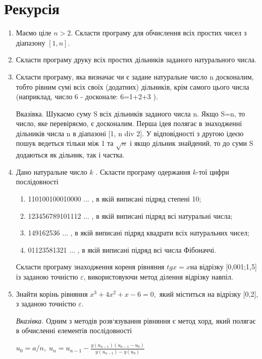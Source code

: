 \documentclass[]{article}
\makeatletter
\newcommand{\xslalph}[1]{\expandafter\@xslalph\csname c@#1\endcsname}
\newcommand{\@xslalph}[1]{%
    \ifcase#1\or а\or б\or в\or г\or д\or e\or є\or ж\or з\or i%
    \or й\or к\or л\or м\or н\or о\or п\or р\or с\or т%
    \or у\or ф\or х\or ц\or ч\or ш\or ю\or я\or аа\or бб\or вв %
    \else\@ctrerr\fi%
}
\makeatother
\begin{document}
\section{Рекурсія}
\begin{enumerate}
\item
Маємо ціле \(n > 2\). Скласти програму для обчислення всіх простих чисел
з діапазону \(\left\lbrack 1,n \right\rbrack.\)
\item
Скласти програму друку всіх простих дільників заданого натурального
числа.
\item
Скласти програму, яка визначає чи є задане натуральне число n
досконалим, тобто рівним сумі всіх своїх (додатних) дільників, крім
самого цього числа (наприклад, число 6 - досконале: 6=1+2+3 ).

Вказівка. Шукаємо суму S всіх дільників заданого числа n. Якщо S=n, то
число, яке перевіряємо, є досконалим. Перша ідея полягає в знаходженні
дільників числа n в діапазоні {[}1, n div 2{]}. У відповідності з другою
ідеєю пошук ведеться тільки між 1 та \(\sqrt{n}\) і якщо дільник
знайдений, то до суми S додаються як дільник, так і частка.

\item
  Дано натуральне число $k$ . Скласти програму одержання $k$-тої цифри послідовності
\begin{enumerate}[label=\xslalph*)]
\item 110100100010000 ... , в якій виписані підряд степені 10;
\item 123456789101112 ... , в якій виписані підряд всі натуральні числа;
\item 149162536 ... , в якій виписані підряд квадрати всіх натуральних
чисел;
\item 01123581321 ... , в якій виписані підряд всі числа Фібоначчі.

\end{enumerate}
Скласти програму знаходження кореня рівняння \(tgx = x\)на відрізку
{[}0,001;1,5{]} із заданою точністю \(\varepsilon\), використовуючи
метод ділення відрізку навпіл.
\item
  Знайти корінь рівняння \(x^{3} + 4x^{2} + x - 6 = 0,\) який міститься
  на відрізку {[}0,2{]}, з заданою точністю \(\varepsilon\).

\emph{\emph{Вказівка.}} Одним з методів розв`язування рівняння є метод
хорд, який полягає в обчисленні елементів послідовності 

\(u_{0} = a / n, \;  u_{n} = u_{n-1} - \frac{y(u_{n-1}) (u_{n-1} -u_{0})}{y(u_{n-1}) -y(u_{0})} \) 


\end{enumerate}
\end{document}
